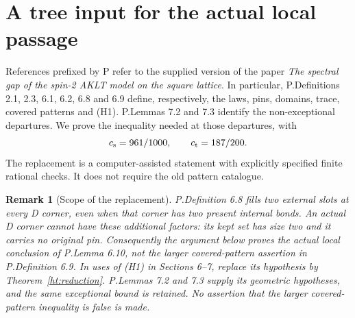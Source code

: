 \newtheorem{htthm}{Theorem}[section]
\newtheorem{htlem}[htthm]{Lemma}
\newtheorem{htdef}[htthm]{Definition}
\newtheorem{htprop}[htthm]{Proposition}
\newtheorem{htrem}[htthm]{Remark}
\newcommand{\htU}{\mathrm U}
\newcommand{\htD}{\mathrm D}
\newcommand{\htX}{\mathrm X}
\newcommand{\htM}[2]{#1_{\rm m}(#2)}
\newcommand{\htV}[2]{#1[#2]}
\newcommand{\htcur}{Z_{\rm cur}}
\newcommand{\htnext}{Z_{\rm next}}
\newcommand{\htF}{F_c}
\newcommand{\htball}{\overline B}
\section{A tree input for the actual local passage}\label{ht:section}

References prefixed by P refer to the supplied version of the paper
\emph{The spectral gap of the spin-2 AKLT model on the square lattice}.
In particular, P.Definitions 2.1, 2.3, 6.1, 6.2, 6.8 and 6.9 define,
respectively, the laws, pins, domains, trace, covered patterns and (H1).
P.Lemmas 7.2 and 7.3 identify the non-exceptional departures.
We prove the inequality needed at those departures, with
\begin{equation}\label{ht:constants}
 c_{\rm s}=961/1000,\qquad c_{\rm t}=187/200.
\end{equation}
The replacement is a computer-assisted statement with explicitly specified
finite rational checks. It does not require the old pattern catalogue.

\begin{htrem}[Scope of the replacement]\label{ht:scope}
P.Definition 6.8 fills two external slots at every D corner, even when
that corner has two present internal bonds. An actual D corner cannot
have these additional factors: its kept set has size two and it carries
no original pin. Consequently the argument below proves the actual
local conclusion of P.Lemma 6.10, not the larger covered-pattern assertion
in P.Definition 6.9. In uses of (H1) in Sections 6--7, replace its
hypothesis by Theorem~\ref{ht:reduction}. P.Lemmas 7.2 and 7.3 supply
its geometric hypotheses, and the same exceptional bound is retained.
No assertion that the larger covered-pattern inequality is false is made.
\end{htrem}


